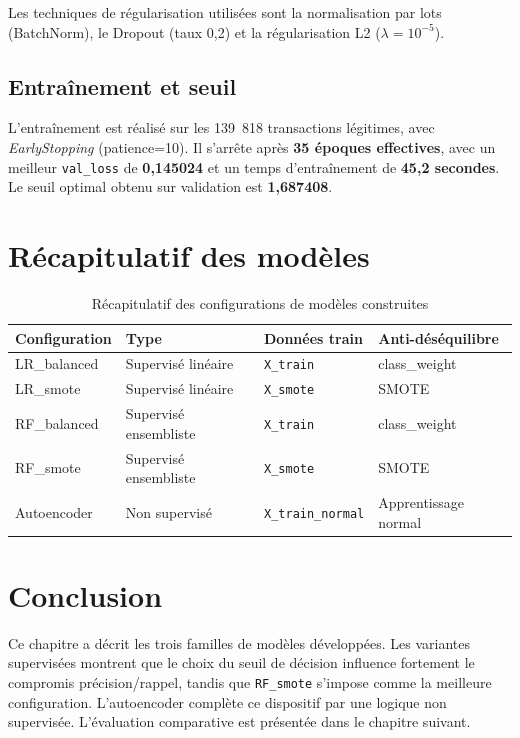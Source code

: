 \documentclass[12pt,a4paper,twoside]{report}
\begin{document}
Les techniques de régularisation utilisées sont la normalisation par lots (BatchNorm), le Dropout (taux 0,2) et la régularisation L2 ($\lambda = 10^{-5}$).

\subsection{Entraînement et seuil}

L'entraînement est réalisé sur les 139~818 transactions légitimes, avec \textit{EarlyStopping} (patience=10). Il s'arrête après \textbf{35 époques effectives}, avec un meilleur \texttt{val\_loss} de \textbf{0,145024} et un temps d'entraînement de \textbf{45,2 secondes}. Le seuil optimal obtenu sur validation est \textbf{1,687408}.

\section{Récapitulatif des modèles}

\begin{table}[H]
\centering
\caption{Récapitulatif des configurations de modèles construites}
\label{tab:models_recap}
\begin{tabular}{llll}
\toprule
\textbf{Configuration} & \textbf{Type}          & \textbf{Données train}      & \textbf{Anti-déséquilibre} \\
\midrule
LR\_balanced           & Supervisé linéaire     & \texttt{X\_train}           & class\_weight \\
LR\_smote              & Supervisé linéaire     & \texttt{X\_smote}           & SMOTE \\
RF\_balanced           & Supervisé ensembliste  & \texttt{X\_train}           & class\_weight \\
RF\_smote              & Supervisé ensembliste  & \texttt{X\_smote}           & SMOTE \\
Autoencoder            & Non supervisé          & \texttt{X\_train\_normal}   & Apprentissage normal \\
\bottomrule
\end{tabular}
\end{table}

\section*{Conclusion}

Ce chapitre a décrit les trois familles de modèles développées. Les variantes supervisées montrent que le choix du seuil de décision influence fortement le compromis précision/rappel, tandis que \texttt{RF\_smote} s'impose comme la meilleure configuration. L'autoencoder complète ce dispositif par une logique non supervisée. L'évaluation comparative est présentée dans le chapitre suivant.
\end{document}
